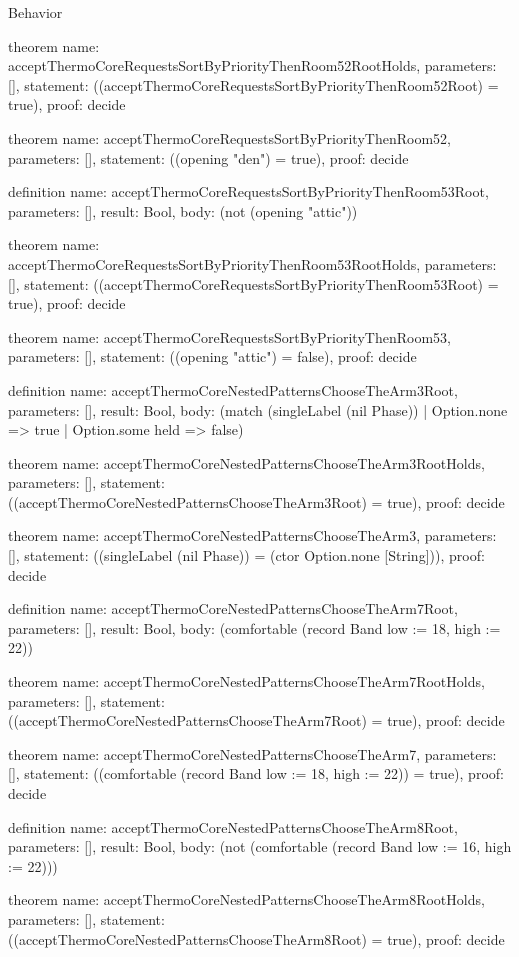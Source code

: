 \begin{lexlean}{Behavior}
\begin{semanticmodule}
theorem{
  name: acceptThermoCoreRequestsSortByPriorityThenRoom52RootHolds,
  parameters: [],
  statement: ((acceptThermoCoreRequestsSortByPriorityThenRoom52Root) = true),
  proof: decide{}
}

theorem{
  name: acceptThermoCoreRequestsSortByPriorityThenRoom52,
  parameters: [],
  statement: ((opening "den") = true),
  proof: decide{}
}

definition{
  name: acceptThermoCoreRequestsSortByPriorityThenRoom53Root,
  parameters: [],
  result: Bool,
  body: (not (opening "attic"))
}

theorem{
  name: acceptThermoCoreRequestsSortByPriorityThenRoom53RootHolds,
  parameters: [],
  statement: ((acceptThermoCoreRequestsSortByPriorityThenRoom53Root) = true),
  proof: decide{}
}

theorem{
  name: acceptThermoCoreRequestsSortByPriorityThenRoom53,
  parameters: [],
  statement: ((opening "attic") = false),
  proof: decide{}
}

definition{
  name: acceptThermoCoreNestedPatternsChooseTheArm3Root,
  parameters: [],
  result: Bool,
  body: (match (singleLabel (nil Phase)) | Option.none => true | Option.some held => false)
}

theorem{
  name: acceptThermoCoreNestedPatternsChooseTheArm3RootHolds,
  parameters: [],
  statement: ((acceptThermoCoreNestedPatternsChooseTheArm3Root) = true),
  proof: decide{}
}

theorem{
  name: acceptThermoCoreNestedPatternsChooseTheArm3,
  parameters: [],
  statement: ((singleLabel (nil Phase)) = (ctor Option.none [String])),
  proof: decide{}
}

definition{
  name: acceptThermoCoreNestedPatternsChooseTheArm7Root,
  parameters: [],
  result: Bool,
  body: (comfortable (record Band {low := 18, high := 22}))
}

theorem{
  name: acceptThermoCoreNestedPatternsChooseTheArm7RootHolds,
  parameters: [],
  statement: ((acceptThermoCoreNestedPatternsChooseTheArm7Root) = true),
  proof: decide{}
}

theorem{
  name: acceptThermoCoreNestedPatternsChooseTheArm7,
  parameters: [],
  statement: ((comfortable (record Band {low := 18, high := 22})) = true),
  proof: decide{}
}

definition{
  name: acceptThermoCoreNestedPatternsChooseTheArm8Root,
  parameters: [],
  result: Bool,
  body: (not (comfortable (record Band {low := 16, high := 22})))
}

theorem{
  name: acceptThermoCoreNestedPatternsChooseTheArm8RootHolds,
  parameters: [],
  statement: ((acceptThermoCoreNestedPatternsChooseTheArm8Root) = true),
  proof: decide{}
}


\end{semanticmodule}
\end{lexlean}

